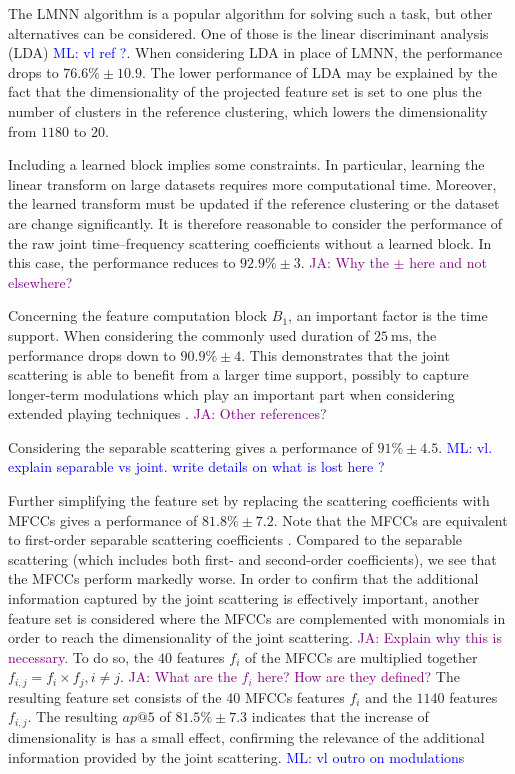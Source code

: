 \documentclass{bmcart}
\newcommand{\ml}[1]{\textcolor{blue}{ML: #1}\xspace}
\newcommand{\ja}[1]{\textcolor{purple}{JA: #1}\xspace}
\begin{document}
The LMNN algorithm is a popular algorithm for solving such a task, but other alternatives can be considered.
One of those is the linear discriminant analysis (LDA) \ml{vl ref ?}\cite{}.
When considering LDA in place of LMNN, the performance drops to $76.6\% \pm 10.9$.
The lower performance of LDA may be explained by the fact that the dimensionality of the projected feature set is set to one plus the number of clusters in the reference clustering, which lowers the dimensionality from $1180$ to $20$.

Including a learned block implies some constraints.
In particular, learning the linear transform on large datasets requires more computational time.
Moreover, the learned transform must be updated if the reference clustering or the dataset are change significantly.
It is therefore reasonable to consider the performance of the raw joint time--frequency scattering coefficients without a learned block.
In this case, the performance reduces to $92.9\% \pm 3$.
\ja{Why the $\pm$ here and not elsewhere?}%

Concerning the feature computation block $B_1$, an important factor is the time support.
When considering the commonly used duration of $25~\mathrm{ms}$, the performance drops down to $90.9\% \pm 4$. This demonstrates that the joint scattering is able to benefit from a larger time support, possibly to capture longer-term modulations which play an important part when considering extended playing techniques \cite{lostanlen2018extended}.
\ja{Other references?}%

Considering the separable scattering gives a performance of $91\% \pm 4.5$. \ml{ vl. explain separable vs joint. write details on what is lost here ?}

Further simplifying the feature set by replacing the scattering coefficients with MFCCs gives a performance of $81.8\% \pm 7.2$.
Note that the MFCCs are equivalent to first-order separable scattering coefficients \cite{anden2014tsp}.
Compared to the separable scattering (which includes both first- and second-order coefficients), we see that the MFCCs perform markedly worse.
In order to confirm that the additional information captured by the joint scattering is effectively important, another feature set is considered where the MFCCs are complemented with monomials in order to reach the dimensionality of the joint scattering.
\ja{Explain why this is necessary.}%
To do so, the $40$ features $f_i$ of the MFCCs are multiplied together $f_{i, j} = f_i \times f_j, i \neq j$.
\ja{What are the $f_i$ here?
How are they defined?}%
The resulting feature set consists of the 40 MFCCs features $f_i$ and the $1140$ features $f_{i, j}$.
The resulting $ap@5$ of $81.5\% \pm 7.3$ indicates that the increase of dimensionality is has a small effect, confirming the relevance of the additional information provided by the joint scattering.
\ml{vl outro on modulations}
\end{document}
